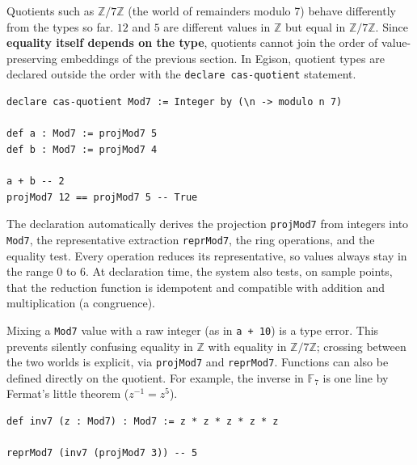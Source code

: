 Quotients such as $\mathbb{Z}/7\mathbb{Z}$ (the world of remainders modulo 7) behave differently from the types so far.
$12$ and $5$ are different values in $\mathbb{Z}$ but equal in $\mathbb{Z}/7\mathbb{Z}$.
Since \textbf{equality itself depends on the type}, quotients cannot join the order of value-preserving embeddings of the previous section.
In Egison, quotient types are declared outside the order with the \lstinline{declare cas-quotient} statement.
\begin{lstlisting}[language=egison,numbers=none]
declare cas-quotient Mod7 := Integer by (\n -> modulo n 7)

def a : Mod7 := projMod7 5
def b : Mod7 := projMod7 4

a + b -- 2
projMod7 12 == projMod7 5 -- True
\end{lstlisting}
The declaration automatically derives the projection \lstinline{projMod7} from integers into \lstinline{Mod7}, the representative extraction \lstinline{reprMod7}, the ring operations, and the equality test.
Every operation reduces its representative, so values always stay in the range $0$ to $6$.
At declaration time, the system also tests, on sample points, that the reduction function is idempotent and compatible with addition and multiplication (a congruence).

Mixing a \lstinline{Mod7} value with a raw integer (as in \lstinline{a + 10}) is a type error.
This prevents silently confusing equality in $\mathbb{Z}$ with equality in $\mathbb{Z}/7\mathbb{Z}$; crossing between the two worlds is explicit, via \lstinline{projMod7} and \lstinline{reprMod7}.
Functions can also be defined directly on the quotient.
For example, the inverse in $\mathbb{F}_7$ is one line by Fermat's little theorem ($z^{-1} = z^5$).
\begin{lstlisting}[language=egison,numbers=none]
def inv7 (z : Mod7) : Mod7 := z * z * z * z * z

reprMod7 (inv7 (projMod7 3)) -- 5
\end{lstlisting}

